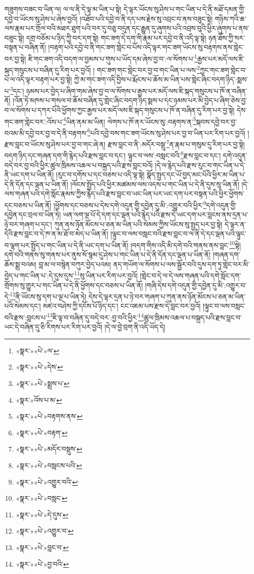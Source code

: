 གཟུགས་བཟང་བ་ཡིན་ལ། ལ་ལ་ནི་དེ་ལྟ་མ་ཡིན་པ་སྟེ། དེ་ལྟར་ཡོངས་སུ་ཤེས་པ་གང་ཡིན་པ་དེ་ནི་མཐོ་དམན་གྱི་དབྱེ་བ་ཡོངས་སུ་ཤེས་པ་ཞེས་བྱའོ། །འཐོབ་པའི་དབྱེ་བ་ནི་དད་པས་རྗེས་སུ་འབྲང་བ་ནས་བཟུང་སྟེ། གཉིས་ཀའི་ཆ་ལས་རྣམ་པར་གྲོལ་བའི་མཐར་ཐུག་པའི་བར་དུ་བཅུ་བདུན་དང་རྒྱུན་དུ་ཞུགས་པའི་འབྲས་བུའི་ཕྱིར་ཞུགས་པ་ནས་བཟུང་སྟེ། དགྲ་བཅོམ་པ་ཉིད་ཀྱི་བར་དག་སྟེ། གང་ཟག་དེ་དག་གི་རྣམ་པར་དབྱེ་བ་ནི་འདི་ལྟ་སྟེ། ཉན་ཐོས་ཀྱི་སར་བསྟན་པ་བཞིན་ནོ། །བརྟག་པའི་དབྱེ་བ་ནི་གང་ཟག་གླེང་བ་པོས་འདི་ལྟར་གང་ཟག་ཡོངས་སུ་བརྟགས་ནས་གླེང་བར་བྱ་སྟེ། ཇི་གང་ཟག་འདི་བདག་ལ་བྱམས་པ་གུས་པ་ཡོད་དམ་ཞེས་བྱ་བ་:ལ་སོགས་པ་\footnote{«སྣར་»«པེ་»ལ་}རྒྱས་པར་མདོ་ལས་ཇི་སྐད་གསུངས་པ་བཞིན་དུ་རིག་པར་བྱའོ། །
གང་ཟག་གང་གླེང་བར་བྱ་བ་གང་ཡིན་པ་ལས་\footnote{«སྣར་»«པེ་»དེས་}ཀྱང་གང་ཟག་གླེང་བ་པོ་ལ་འདི་ལྟར་བརྟག་པར་བྱ་སྟེ། ཀྱེ་མ་གང་ཟག་འདི་བྱིས་པ་རྨོངས་པ་ཆོས་མ་ཡིན་པས་གླེང་ཞིང་བདག་ཉིད་:སྨས་པ་\footnote{«སྣར་»«པེ་»སྨྲས་པ་}དང་། ཉམས་པར་བྱེད་པ་ཞིག་གམ་ཞེས་བྱ་བ་ལ་སོགས་པ་རྒྱས་པར་མདོ་ལས་ཇི་སྐད་གསུངས་པ་ཁོ་ན་བཞིན་ནོ། །འོན་ཏེ་མཁས་པ་གསལ་བ་ཆོས་བཞིན་དུ་གླེང་ཞིང་བདག་ཉིད་སྨས་པ་དང་ཉམས་པར་མི་བྱེད་པ་ཞིག་ཅེས་བྱ་བ་ལ་སོགས་པ་དཀར་པོའི་ཕྱོགས་ཀྱང་རྒྱས་པར་མདོ་ལས་ཇི་སྐད་གསུངས་པ་ཁོ་ན་བཞིན་དུ་རིག་པར་བྱ་སྟེ། དེས་གང་ཟག་གླེང་བར་:འོས་པ་\footnote{«སྣར་»འོས་པ་མ་}ཡིན་ནམ་མ་ཡིན། ལེགས་པ་ཁོ་ནར་ཡོངས་སུ་:བརྟགས་ན་\footnote{«སྣར་»«པེ་»བརྟགས་ནས་}སྐབས་དབྱེ་བར་བྱ་བའམ་མི་དབྱེ་བར་བྱ་བ་དེ་ནི་བརྟགས་\footnote{«སྣར་»«པེ་»བརྟག་}པའི་དབྱེ་བས་གང་ཟག་ཡོངས་སུ་ཤེས་པར་བྱ་བ་ཡིན་པར་རིག་པར་བྱའོ། །རྫས་བླང་བ་ཡོངས་སུ་ཤེས་པར་བྱ་བ་གང་ཞེ་ན། རྫས་བླང་བ་ནི་:མདོར་བསྡུ་\footnote{«སྣར་»«པེ་»མདོར་བསྡུས་}ན་རྣམ་པ་གསུམ་དུ་རིག་པར་བྱ་སྟེ། བདག་ཉིད་དང་གཞན་དག་གི་རྙེད་པའི་རྫས་བླང་བ་དང་། ལྟུང་བ་ལས་:བསླང་བའི་\footnote{«སྣར་»«པེ་»བསླངས་པའི་}རྫས་བླང་བ་དང་། དགེ་འདུན་བདེ་བར་བྱ་བའི་ཕྱིར་ཚུལ་ཁྲིམས་འཆལ་པ་བསྐྲད་པའི་རྫས་བླང་བའོ། །དེ་ལ་རྙེད་པའི་རྫས་རུང་བ་གང་ཡིན་པ་དེ་ནི་ཡང་དག་པ་ཡིན་ནོ། །རུང་བ་དགོས་པ་དང་བཅས་པ་འདི་ལྟ་སྟེ། སྣོད་སྤྱད་དང་ཡོ་བྱད་མང་པོའི་ཕྱིར་མ་ཡིན་པ་དེ་ནི་དོན་དང་ལྡན་པ་ཡིན་ནོ། །ལོངས་སྤྱོད་པའི་ཕྱིར་མཚམས་ལས་འདས་པ་གང་ཡིན་པ་དེ་ནི་དུས་སུ་ཡིན་ནོ། །དེ་ལས་གཞན་པའི་དགེ་སློང་རྣམས་ཀྱིས་རྙེད་པའི་རྫས་བླང་བ་ཡང་ཡིན་པར་ཡང་དག་པར་བསྟན་པའི་ཕྱིར་ཕྱོགས་དང་བཅས་པ་ཡིན་ནོ། །ཕྱོགས་དང་བཅས་པ་དེས་དགེ་འདུན་གྱི་དབྱེན་དུ་མི་:འགྱུར་བའི་ཕྱིར་\footnote{«སྣར་»«པེ་»འགྱུར་བའི་}དགེ་འདུན་གྱི་དབྱེན་དང་བྲལ་བ་ཡིན་ཏེ། ཡན་ལག་ལྔ་པོ་དེ་དག་དང་ལྡན་པའི་རྙེད་པའི་རྫས་དེ་ཡང་དག་པར་བླངས་ནས་དྲན་པ་ཉེ་བར་གཞག་པ་དང་། ཀུན་ནས་ཉོན་མོངས་པ་ཅན་མ་ཡིན་པའི་སེམས་ཀྱིས་ཡོངས་སུ་སྤྱད་པར་བྱ་སྟེ། དེ་ལྟར་ན་དེའི་རྫས་བླང་བ་དེ་ཁ་ན་མ་ཐོ་བ་མེད་པ་ཡིན་ནོ། །ལྟུང་བ་ལས་བསླང་བའི་རྫས་བླང་བ་ལ་ནི་དེ་དང་ལྡན་པའི་ལྟུང་བ་ལྷག་པར་སྤྱོད་པ་གང་ཡིན་པ་དེ་ནི་ཡང་དག་པ་ཡིན་ནོ། །བདག་གིས་འདི་མི་དགེ་བའི་གནས་ནས་བླང་\footnote{«སྣར་»«པེ་»བསླང་}སྟེ། དགེ་བའི་གནས་སུ་གནས་པར་ནུས་སོ་སྙམ་དུ་ཤེས་པ་གང་ཡིན་པ་དེ་ནི་དོན་དང་ལྡན་པ་ཡིན་ནོ། །གཞན་དག་ཆོས་སྨྲ་བའམ། བླ་མ་ལ་བསྙེན་བཀུར་བྱེད་པའམ། ནད་གཡོག་ལ་སོགས་པ་ལས་སྦྱོར་བའི་དུས་དག་ཏུ་གླེང་བར་མི་བྱེད་པ་གང་ཡིན་པ་:དེ་དུས་དུས་\footnote{«སྣར་»«པེ་»དེ་དུས་}སུ་ཡིན་པར་རིག་པར་བྱའོ། །གླེང་བ་དེ་ལ་དེ་ལས་གཞན་པའི་དགེ་སློང་དག་གྲོགས་སུ་གྱུར་པ་གང་ཡིན་པ་དེ་ནི་ཕྱོགས་དང་བཅས་པ་ཡིན་ནོ། །གཞི་དེས་དགེ་འདུན་གྱི་དབྱེན་དུ་མི་:འགྱུར་བ་དེ་\footnote{«སྣར་»«པེ་»འགྱུར་བ་}ནི་ཡོངས་སུ་དག་པ་ལྔ་པ་ཡིན་ཏེ། དེས་དེ་ལྟར་དྲན་པ་ཉེ་བར་གཞག་པ་ཀུན་ནས་ཉོན་མོངས་པ་ཅན་མ་ཡིན་པའི་སེམས་དང་། མཛའ་བཤེས་ཀྱི་དངོས་པོ་ཉིད་དང་། ངང་འཇམ་པས་རྫས་དེ་བླང་བར་བྱའོ། །ལྟུང་བ་ལས་བསླང་བའི་རྫས་:བླངས་པ་\footnote{«སྣར་»«པེ་»བླང་བ་}ཇི་ལྟ་བ་བཞིན་དུ་བདེ་བར་:བྱ་བའི་ཕྱིར་\footnote{«སྣར་»«པེ་»བྱ་བའི་}ཚུལ་ཁྲིམས་འཆལ་པ་བསྐྲད་པའི་རྫས་བླང་བ་ཡང་དེ་བཞིན་དུ་ཅི་རིགས་པར་རིག་པར་བྱའོ། །དེ་ལ་བྱེ་བྲག་ནི་འདི་ཡོད་དེ། 